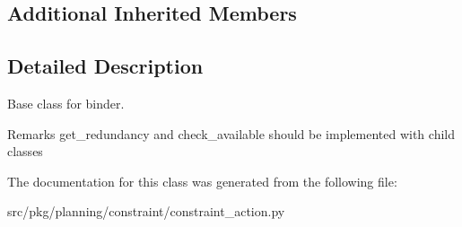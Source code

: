 \subsection*{Additional Inherited Members}


\subsection{Detailed Description}
Base class for binder. 

\begin{DoxyRemark}{Remarks}
get\+\_\+redundancy and check\+\_\+available should be implemented with child classes 
\end{DoxyRemark}


The documentation for this class was generated from the following file\+:\begin{DoxyCompactItemize}
\item 
src/pkg/planning/constraint/constraint\+\_\+action.\+py\end{DoxyCompactItemize}
